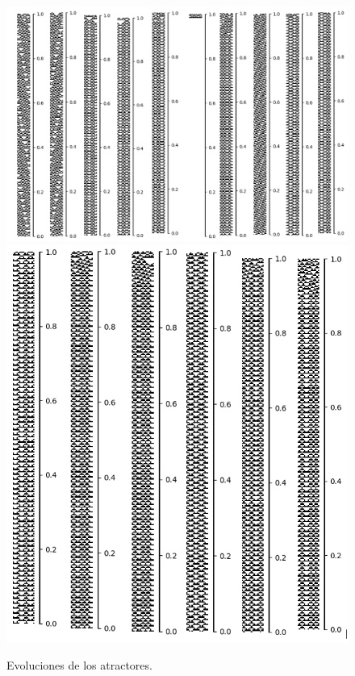 \documentclass[11pt]{article}
\begin{document}
			\begin{figure}[H]
			\centering
			\includegraphics[scale=0.3]{resources/Atractores54/atractor_54_size_17_res.png}
			\includegraphics[scale=0.3]{resources/Atractores54/atractor_54_size_17_res1.png}
			\caption{Evoluciones de los atractores.}\label{fig:picture}
			\end{figure}
\end{document}
